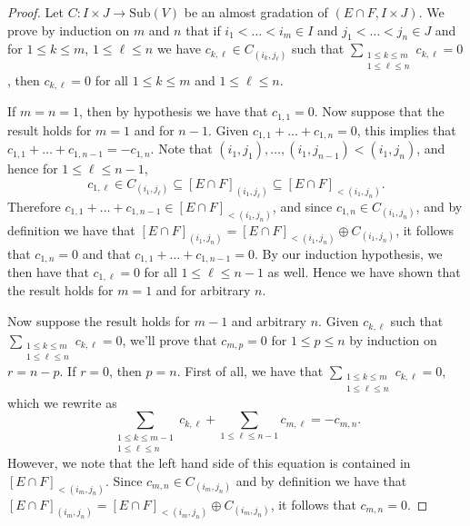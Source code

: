 \documentclass[oneside,11pt]{amsart}
\newcommand{\Sub}{\ensuremath{\text{Sub}}}
\theoremstyle{definition}
\newtheorem{proof techniques}{Proof Techniques}
\begin{document}
\begin{proof}
Let $C : I \times J \to \Sub(V)$ be an almost gradation of $(E \cap F , I \times J)$. We prove by induction on $m$ and $n$ that if $i_1 < \ldots < i_m \in I$ and $j_1 < \ldots < j_n \in J$ and for $1 \leq k \leq m$, $1 \leq \ell \leq n$ we have $c_{k , \ell} \in C_{(i_k , j_\ell )}$ such that $\sum_{\substack{1 \leq k \leq m \\ 1 \leq \ell \leq n}} c_{k , \ell} = 0$, then $c_{k , \ell} = 0$ for all $1 \leq k \leq m$ and $1 \leq \ell \leq n$.

If $m = n = 1$, then by hypothesis we have that $c_{1 , 1} = 0$. Now suppose that the result holds for $m = 1$ and for $n - 1$. Given $c_{1 , 1} + \ldots + c_{1 , n} = 0$, this implies that $c_{1 , 1} + \ldots + c_{1 , n - 1} = - c_{1 , n}$. 
Note that $(i_1, j_1), \ldots, (i_1 , j_{n - 1} ) < (i_1, j_n)$, and hence for $1 \leq \ell \leq n - 1$, 
\begin{equation*}
c_{1 , \ell} \in C_{(i_1 , j_\ell )} \subseteq [E \cap F]_{(i_1 , j_\ell )} \subseteq [E \cap F]_{ < ( i_1, j_n ) }.
\end{equation*}
Therefore $c_{1 , 1} + \ldots + c_{1 , n - 1} \in [E \cap F]_{ < ( i_1, j_n ) }$, and since $c_{1 , n} \in C_{(i_1, j_n)}$, and by definition we have that $[E \cap F]_{ ( i_1, j_n ) } = [E \cap F]_{ < ( i_1, j_n ) } \oplus C_{(i_1, j_n)}$, it follows that $c_{1 , n} = 0$ and that $c_{1 , 1} + \ldots + c_{1 , n - 1} = 0$. By our induction hypothesis, we then have that $c_{1 , \ell} = 0$ for all $1 \leq \ell \leq n - 1$ as well. Hence we have shown that the result holds for $m = 1$ and for arbitrary $n$. 

Now suppose the result holds for $m - 1$ and arbitrary $n$. Given $c_{k , \ell}$ such that $\sum_{\substack{1 \leq k \leq m \\ 1 \leq \ell \leq n}} c_{k , \ell} = 0$, we'll prove that $c_{m , p} = 0$ for $1 \leq p \leq n$ by induction on $r = n - p$. If $r = 0$, then $p = n$. First of all, we have that $\sum_{\substack{1 \leq k \leq m \\ 1 \leq \ell \leq n}} c_{k , \ell} = 0$, which we rewrite as
\begin{equation*}
\sum_{\substack{1 \leq k \leq m - 1 \\ 1 \leq \ell \leq n}} c_{k , \ell} + \sum_{1 \leq \ell \leq n - 1} c_{m , \ell} = - c_{m , n}.
\end{equation*}
However, we note that the left hand side of this equation is contained in $[E \cap F]_{ < ( i_m, j_n ) }$. Since $c_{m , n} \in C_{(i_m , j_n )}$ and by definition we have that $[E \cap F]_{( i_m, j_n ) } =  [E \cap F]_{ < ( i_m, j_n ) } \oplus C_{(i_m , j_n )}$, it follows that $c_{m , n} = 0$. 


\end{proof}
\end{document}

